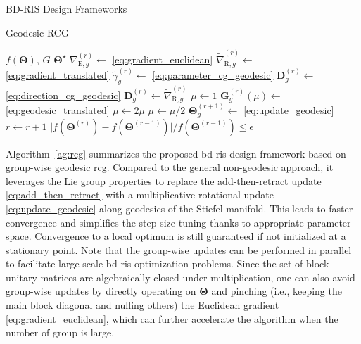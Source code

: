 \begin{section}{BD-RIS Design Frameworks}
\begin{subsection}{Geodesic RCG}
	\begin{algorithm}[!t]
		\caption{Group-wise geodesic \gls{rcg} for \gls{bd}-\gls{ris} design}
		\label{ag:rcg}
		\begin{algorithmic}[1]
			\Require $f(\mathbf{\Theta})$, $G$
			\Ensure $\mathbf{\Theta}^\star$
			\Repeat
			\State $\nabla_{\mathrm{E},g}^{(r)} \gets$ \eqref{eq:gradient_euclidean} \label{ln:gradient_euclidean}
			\State $\tilde{\nabla}_{\mathrm{R},g}^{(r)} \gets$ \eqref{eq:gradient_translated}
			\State $\tilde{\gamma}_g^{(r)} \gets$ \eqref{eq:parameter_cg_geodesic}
			\State $\mathbf{D}_g^{(r)} \gets$ \eqref{eq:direction_cg_geodesic}
			 
			\State $\mathbf{D}_g^{(r)} \gets \tilde{\nabla}_{\mathrm{R},g}^{(r)}$
			\EndIf
			\State $\mu \gets 1$
			\State $\mathbf{G}_g^{(r)}(\mu) \gets$ \eqref{eq:geodesic_translated}
			 \label{ln:armijo_start}
			\State $\mu \gets 2 \mu$
			\EndWhile
			\State $\mu \gets \mu / 2$
			\EndWhile \label{ln:armijo_end}
			\State $\mathbf{\Theta}_g^{(r+1)} \gets$ \eqref{eq:update_geodesic}
			\EndFor
			\State $r \gets r+1$
			\Until $\lvert f(\mathbf{\Theta}^{(r)}) - f(\mathbf{\Theta}^{(r-1)}) \rvert / f(\mathbf{\Theta}^{(r-1)}) \le \epsilon$
		\end{algorithmic}
	\end{algorithm}

	Algorithm~\ref{ag:rcg} summarizes the proposed \gls{bd}-\gls{ris} design framework based on group-wise geodesic \gls{rcg}.
	Compared to the general non-geodesic approach, it leverages the Lie group properties to replace the add-then-retract update \eqref{eq:add_then_retract} with a multiplicative rotational update \eqref{eq:update_geodesic} along geodesics of the Stiefel manifold.
	This leads to faster convergence and simplifies the step size tuning thanks to appropriate parameter space.
	Convergence to a local optimum is still guaranteed if not initialized at a stationary point.
	Note that the group-wise updates can be performed in parallel to facilitate large-scale \gls{bd}-\gls{ris} optimization problems.
	Since the set of block-unitary matrices are algebraically closed under multiplication, one can also avoid group-wise updates by directly operating on $\mathbf{\Theta}$ and pinching (i.e., keeping the main block diagonal and nulling others) the Euclidean gradient \eqref{eq:gradient_euclidean}, which can further accelerate the algorithm when the number of group is large.
\end{subsection}


\end{section}
